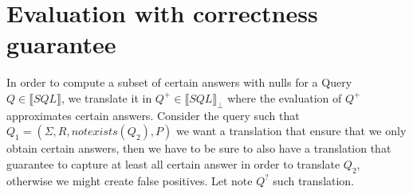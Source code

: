 \section{Evaluation with correctness guarantee}
\label{translation}

In order to compute a  subset of certain answers with nulls for a Query $Q \in \llbracket SQL\rrbracket$, we translate it in $Q^+ \in \llbracket SQL\rrbracket_\bot$ where the evaluation of $Q^+$ approximates certain answers. 
Consider the query such that $Q_1 = (\Sigma,R,notexists(Q_2),P)$ we want a translation that ensure that we only obtain certain answers, then we have to be sure to also have a translation that guarantee to capture at least all certain answer in order to translate $Q_2$, otherwise we might create false positives. Let note $Q^?$ such translation. %


